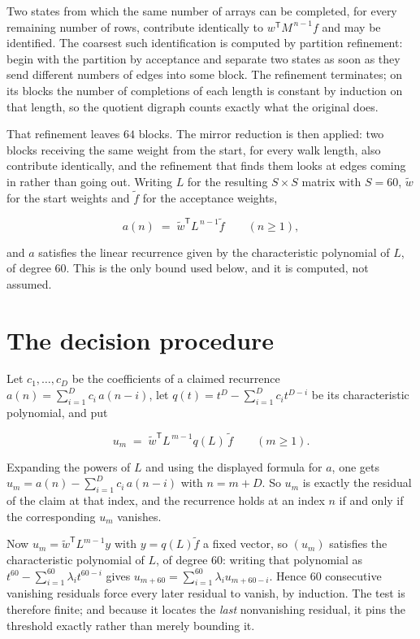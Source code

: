 \documentclass[11pt]{article}
\theoremstyle{definition}
\begin{document}
Two states from which the same number of arrays can be completed, for every remaining number of rows, contribute identically to $w^{\mathsf T}M^{\,n-1}f$ and may be identified. The coarsest such identification is computed by partition refinement: begin with the partition by acceptance and separate two states as soon as they send different numbers of edges into some block. The refinement terminates; on its blocks the number of completions of each length is constant by induction on that length, so the quotient digraph counts exactly what the original does.

That refinement leaves $64$ blocks. The mirror reduction is then applied: two blocks receiving the same weight from the start, for every walk length, also contribute identically, and the refinement that finds them looks at edges coming in rather than going out. Writing $L$ for the resulting $S \times S$ matrix with $S = 60$, $\tilde w$ for the start weights and $\tilde f$ for the acceptance weights,

\[a(n) \;=\; \tilde w^{\mathsf T} L^{\,n-1} \tilde f \qquad (n \ge 1),\]

and $a$ satisfies the linear recurrence given by the characteristic polynomial of $L$, of degree $60$. This is the only bound used below, and it is computed, not assumed.

\section{The decision procedure}

Let $c_1,\dots,c_D$ be the coefficients of a claimed recurrence $a(n) = \sum_{i=1}^{D} c_i\,a(n-i)$, let $q(t) = t^{D} - \sum_{i=1}^{D} c_i t^{D-i}$ be its characteristic polynomial, and put

\[u_m \;=\; \tilde w^{\mathsf T} L^{\,m-1} q(L)\,\tilde f \qquad (m \ge 1).\]

Expanding the powers of $L$ and using the displayed formula for $a$, one gets $u_m = a(n) - \sum_{i=1}^{D} c_i\,a(n-i)$ with $n = m + D$. So $u_m$ is exactly the residual of the claim at that index, and the recurrence holds at an index $n$ if and only if the corresponding $u_m$ vanishes.

Now $u_m = \tilde w^{\mathsf T} L^{m-1} y$ with $y = q(L)\tilde f$ a fixed vector, so $(u_m)$ satisfies the characteristic polynomial of $L$, of degree $60$: writing that polynomial as $t^{60} - \sum_{i=1}^{60} \lambda_i t^{60-i}$ gives $u_{m+60} = \sum_{i=1}^{60} \lambda_i u_{m+60-i}$. Hence $60$ consecutive vanishing residuals force every later residual to vanish, by induction. The test is therefore finite; and because it locates the {\itshape last} nonvanishing residual, it pins the threshold exactly rather than merely bounding it.
\end{document}
